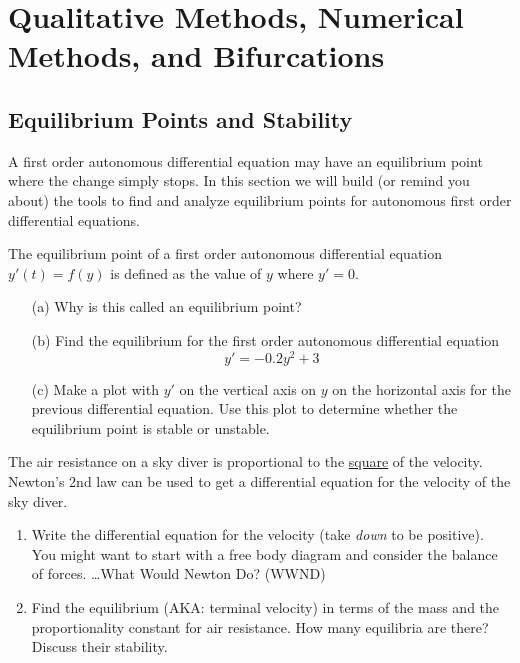 \chapter{Qualitative Methods, Numerical Methods, and Bifurcations}
\section{Equilibrium Points and Stability}
A first order autonomous differential equation may have an equilibrium point where the
change simply stops.  In this section we will build (or remind you about) the tools to
find and analyze equilibrium points for autonomous first order differential equations.

\begin{problem}
    The equilibrium point of a first order autonomous differential equation $y'(t) = f(y)$ is defined as
    the value of $y$ where $y'=0$.  
    \begin{itemize}
        \item[(a)] Why is this called an equilibrium point?
        \item[(b)] Find the equilibrium for the first order autonomous differential equation
            \[ y' = -0.2y^2 + 3 \]
        \item[(c)] Make a plot with $y'$ on the vertical axis on $y$ on the horizontal axis for
            the previous differential equation.  Use this plot to determine whether the
            equilibrium point is stable or unstable.
    \end{itemize}
\end{problem}


\begin{problem}
    The air resistance on a sky diver is proportional to the \underline{square} of the velocity.
    Newton's 2nd law can be used to get a differential equation for the velocity of the
    sky diver.
    \begin{enumerate}
        \item Write the differential equation for the velocity (take {\it down} to be
        positive).  You might want to start with a free body diagram and consider the
        balance of forces.  \ldots What Would Newton Do? (WWND)
        \item Find the equilibrium (AKA: terminal velocity) in terms of the mass and the
            proportionality constant for air resistance. How many equilibria are there?
            Discuss their stability.
    \end{enumerate}
\end{problem}


